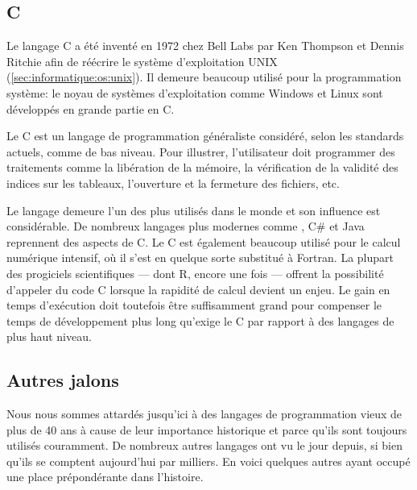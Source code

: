 \subsection{C}
\label{sec:informatique:historique:c}

Le langage C a été inventé en 1972 chez Bell Labs par Ken Thompson et
Dennis Ritchie afin de réécrire le système d'exploitation UNIX
(\autoref{sec:informatique:os:unix}). Il demeure beaucoup utilisé pour
la programmation système: le noyau de systèmes d'exploitation comme
Windows et Linux sont développés en grande partie en C.

Le C est un langage de programmation généraliste considéré, selon les
standards actuels, comme de bas niveau. Pour illustrer, l'utilisateur
doit programmer des traitements comme la libération de la mémoire, la
vérification de la validité des indices sur les tableaux, l'ouverture
et la fermeture des fichiers, etc.

Le langage demeure l'un des plus utilisés dans le monde et son
influence est considérable. De nombreux langages plus modernes comme
\Cpp, C\# et Java reprennent des aspects de C. Le C est également
beaucoup utilisé pour le calcul numérique intensif, où il s'est en
quelque sorte substitué à Fortran. La plupart des progiciels
scientifiques --- dont R, encore une fois --- offrent la possibilité
d'appeler du code C lorsque la rapidité de calcul devient un enjeu. Le
gain en temps d'exécution doit toutefois être suffisamment grand pour
compenser le temps de développement plus long qu'exige le C par
rapport à des langages de plus haut niveau.

\begin{figure}[t]
\end{figure}

\subsection{Autres jalons}
\label{sec:informatique:historique:autres}

Nous nous sommes attardés jusqu'ici à des langages de programmation
vieux de plus de 40 ans à cause de leur importance historique et parce
qu'ils sont toujours utilisés couramment. De nombreux autres langages
ont vu le jour depuis, si bien qu'ils se comptent aujourd'hui par
milliers. En voici quelques autres ayant occupé une place
prépondérante dans l'histoire.


